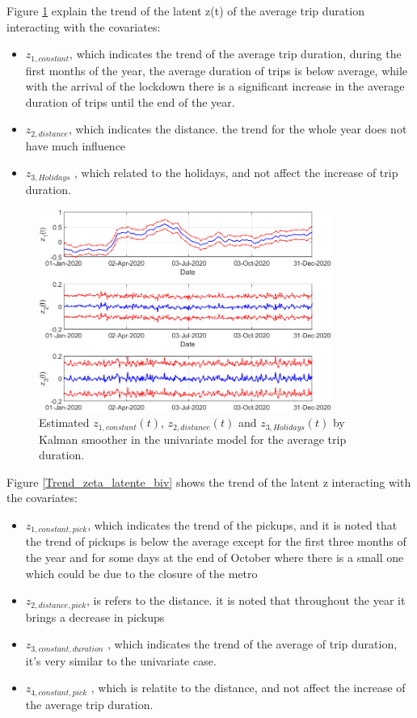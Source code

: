 Figure \ref{Trend_zeta_latente univariato} explain the trend of the latent z(t) of the average trip duration interacting with the covariates:
\begin{itemize}
	\item $z_{1,constant}$, which indicates the trend of the average trip duration, during the first months of the year, the average duration of trips is below average, while with the arrival of the lockdown there is a significant increase in the average duration of trips until the end of the year.
	\item $z_{2,distance}$, which indicates the distance. the trend for the whole year does not have much influence
	\item $z_{3,Holidays}$ , which related to the holidays, and not affect the increase of trip duration.
\end{itemize}
\noindent


\begin{figure}[h!]
	\centering
	\includegraphics[height=250px]{Images/Data analysis/DCM/trend_z_selected_trip_model.png}
	\caption[Estimated $z_{1}(t)$,  $z_{2}(t)$ and $z_{3}(t)$ by Kalman smoother in the univariate model for pickups (DCM)]{Estimated $z_{1,constant}(t)$,  $z_{2,distance}(t)$ and $z_{3,Holidays}(t)$ by Kalman smoother in the univariate model for the average trip duration.}
	\label{Trend_zeta_latente univariato}
	
\end{figure}

\noindent
Figure \ref{Trend_zeta_latente_biv} shows the trend of the latent z interacting with the covariates:
\begin{itemize}
	\item $z_{1,constant,pick}$, which indicates the trend of the pickups, and it is noted that the trend of pickups is below the average except for the first three months of the year and for some days at the end of October where there is a small one which could be due to the closure of the metro
	\item $z_{2,distance,pick}$, is refers to the distance. it is noted that throughout the year it brings a decrease in pickups
	\item $z_{3,constant,duration}$ , which indicates the trend of the average of trip duration, it's very similar to the univariate case.
	\item $z_{4,constant,pick}$ , which is relatite to the distance, and not affect the increase of the average trip duration.
\end{itemize}

